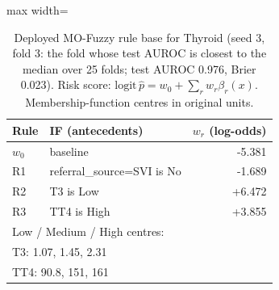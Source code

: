 \begin{table}[t]
\centering
\scriptsize
\caption{Deployed MO-Fuzzy rule base for Thyroid (seed 3, fold 3: the fold whose test AUROC is closest to the median over 25 folds; test AUROC 0.976, Brier 0.023). Risk score: $\mathrm{logit}\,\hat p = w_0 + \sum_r w_r \beta_r(x)$. Membership-function centres in original units.}
\label{tab:rules_thyroid_sick}
\begin{adjustbox}{max width=\linewidth}
\begin{tabular}{p{0.6cm}p{5.2cm}r}
\toprule
Rule & IF (antecedents) & $w_r$ (log-odds) \\
\midrule
$w_0$ & baseline & -5.381 \\
R1 & referral\_source=SVI is No & -1.689 \\
R2 & T3 is Low & +6.472 \\
R3 & TT4 is High & +3.855 \\
\midrule
\multicolumn{3}{l}{Low / Medium / High centres:} \\
\multicolumn{3}{l}{\quad T3: 1.07, 1.45, 2.31} \\
\multicolumn{3}{l}{\quad TT4: 90.8, 151, 161} \\
\bottomrule
\end{tabular}
\end{adjustbox}
\end{table}
